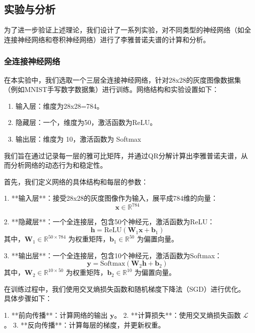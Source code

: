 \documentclass[12pt,a4paper]{amsart}
\begin{document}
\subsection{实验与分析}

为了进一步验证上述理论，我们设计了一系列实验，对不同类型的神经网络（如全连接神经网络和卷积神经网络）进行了李雅普诺夫谱的计算和分析。

\subsubsection{全连接神经网络}

在本实验中，我们选取一个三层全连接神经网络，针对28x28的灰度图像数据集（例如MNIST手写数字数据集）进行训练。网络结构和实验设置如下：

\begin{enumerate}

  \item 输入层：维度为28x28=784。

  \item 隐藏层：一个，维度为50，激活函数为ReLU。

  \item 输出层：维度为 10，激活函数为 Softmax

\end{enumerate}

我们旨在通过记录每一层的雅可比矩阵，并通过QR分解计算出李雅普诺夫谱，从而分析网络的动态行为和稳定性。

首先，我们定义网络的具体结构和每层的参数：

1. **输入层**：接受28x28的灰度图像作为输入，展平成784维的向量：
   \[
   \mathbf{x} \in \mathbb{R}^{784}
   \]

2. **隐藏层**：一个全连接层，包含50个神经元，激活函数为ReLU：
   \[
   \mathbf{h} = \text{ReLU}(\mathbf{W}_1 \mathbf{x} + \mathbf{b}_1)
   \]
   其中，\(\mathbf{W}_1 \in \mathbb{R}^{50 \times 784}\) 为权重矩阵，\(\mathbf{b}_1 \in \mathbb{R}^{50}\) 为偏置向量。

3. **输出层**：一个全连接层，包含10个神经元，激活函数为Softmax：
   \[
   \mathbf{y} = \text{Softmax}(\mathbf{W}_2 \mathbf{h} + \mathbf{b}_2)
   \]
   其中，\(\mathbf{W}_2 \in \mathbb{R}^{10 \times 50}\) 为权重矩阵，\(\mathbf{b}_2 \in \mathbb{R}^{10}\) 为偏置向量。

在训练过程中，我们使用交叉熵损失函数和随机梯度下降法（SGD）进行优化。具体步骤如下：

1. **前向传播**：计算网络的输出 \(\mathbf{y}\)。
2. **计算损失**：使用交叉熵损失函数 \(\mathcal{L}\)。
3. **反向传播**：计算每层的梯度，并更新权重。
\end{document}
